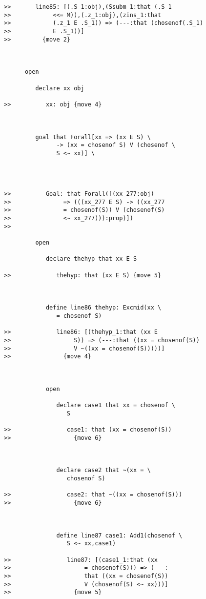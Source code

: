 \documentclass[12pt]{article}
\begin{document}
\begin{verbatim}
>>       line85: [(.S_1:obj),(Ssubm_1:that (.S_1
>>            <<= M)),(.z_1:obj),(zins_1:that
>>            (.z_1 E .S_1)) => (---:that (chosenof(.S_1)
>>            E .S_1))]
>>         {move 2}



      open

         declare xx obj

>>          xx: obj {move 4}



         goal that Forall[xx => (xx E S) \
               -> (xx = chosenof S) V (chosenof \
               S <~ xx)] \
            



>>          Goal: that Forall([(xx_277:obj)
>>               => (((xx_277 E S) -> ((xx_277
>>               = chosenof(S)) V (chosenof(S)
>>               <~ xx_277))):prop)])
>>            

         open

            declare thehyp that xx E S

>>             thehyp: that (xx E S) {move 5}



            define line86 thehyp: Excmid(xx \
               = chosenof S)

>>             line86: [(thehyp_1:that (xx E
>>                  S)) => (---:that ((xx = chosenof(S))
>>                  V ~((xx = chosenof(S)))))]
>>               {move 4}



            open

               declare case1 that xx = chosenof \
                  S

>>                case1: that (xx = chosenof(S))
>>                  {move 6}



               declare case2 that ~(xx = \
                  chosenof S)

>>                case2: that ~((xx = chosenof(S)))
>>                  {move 6}



               define line87 case1: Add1(chosenof \
                  S <~ xx,case1)

>>                line87: [(case1_1:that (xx
>>                     = chosenof(S))) => (---:
>>                     that ((xx = chosenof(S))
>>                     V (chosenof(S) <~ xx)))]
>>                  {move 5}




\end{verbatim}
\end{document}
